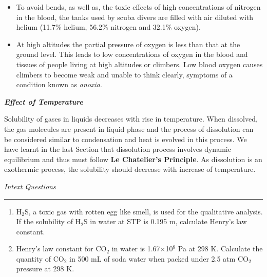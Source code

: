 \documentclass[11pt,a4paper]{article}
\begin{document}
\noindent\hfill\begin{minipage}[t]{0.765\textwidth}
\begin{itemize}[leftmargin=14pt,itemsep=3pt,topsep=0pt,label=\textbullet]
\item[] To avoid bends, as well as, the toxic effects of high concentrations of nitrogen in the blood, the tanks used by scuba divers are filled with air diluted with helium (11.7\% helium, 56.2\% nitrogen and 32.1\% oxygen).
\item At high altitudes the partial pressure of oxygen is less than that at the ground level. This leads to low concentrations of oxygen in the blood and tissues of people living at high altitudes or climbers. Low blood oxygen causes climbers to become weak and unable to think clearly, symptoms of a condition known as \textit{anoxia}.
\end{itemize}

{\color{gray}\bfseries\itshape Effect of Temperature}

Solubility of gases in liquids decreases with rise in temperature. When dissolved, the gas molecules are present in liquid phase and the process of dissolution can be considered similar to condensation and heat is evolved in this process. We have learnt in the last Section that dissolution process involves dynamic equilibrium and thus must follow \textbf{Le Chatelier's Principle}. As dissolution is an exothermic process, the solubility should decrease with increase of temperature.
\end{minipage}

\vspace{6pt}
\begin{tcolorbox}[enhanced,colback=white,colframe=gray!40,boxrule=0.8pt,arc=2mm,left=14pt,right=34pt,top=4pt,bottom=4pt,boxsep=0pt,width=0.94\textwidth,drop fuzzy shadow=gray!40,overlay={\fill[salmon] ([xshift=-14pt]frame.south east) rectangle (frame.north east);}]
\hfill{\large\itshape Intext Questions}\\[-4pt]
\mbox{}\hfill{\color{salmon}\rule{0.32\linewidth}{0.8pt}}
\begin{enumerate}[label=\textbf{1.\arabic*},leftmargin=30pt,itemsep=3pt,topsep=2pt,start=6]
\item H$_2$S, a toxic gas with rotten egg like smell, is used for the qualitative analysis. If the solubility of H$_2$S in water at STP is 0.195 m, calculate Henry's law constant.
\item Henry's law constant for CO$_2$ in water is 1.67$\times$10$^{8}$ Pa at 298 K. Calculate the quantity of CO$_2$ in 500 mL of soda water when packed under 2.5 atm CO$_2$ pressure at 298 K.
\end{enumerate}
\end{tcolorbox}
\end{document}

